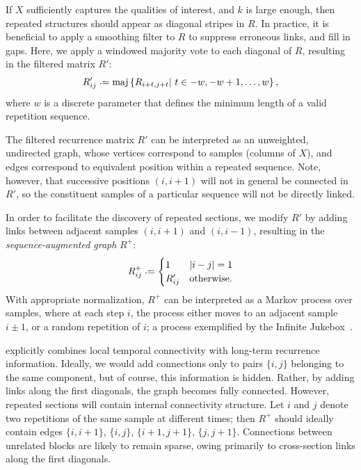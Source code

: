 \documentclass{article}
\begin{document}

If $X$ sufficiently captures the qualities of interest, and $k$ is large
enough, then repeated structures should appear as diagonal stripes in $R$.
In practice, it is beneficial to apply a smoothing filter to $R$ to suppress erroneous
links, and fill in gaps.  Here, we apply a windowed majority vote to each diagonal of
$R$, resulting in the filtered matrix $R'$:
\begin{equation}
R'_{ij} \defeq \maj\left\{ R_{i+t, j+t} \given t \in -w, -w+1, \dots, w\right\},
\label{filtered-rep}
\end{equation}
where $w$ is a discrete parameter that defines the minimum length of a valid
repetition sequence.

The filtered recurrence matrix $R'$ can be interpreted as an unweighted, undirected 
graph, whose vertices correspond to samples (columns of $X$), and edges correspond 
to equivalent position within a repeated sequence. Note, however, that successive 
positions $(i, i+1)$ will not in general be connected in $R'$, so the constituent 
samples of a particular sequence will not be directly linked.

In order to facilitate the discovery of repeated sections, we modify $R'$ by 
adding links between adjacent samples $(i, i+1)$ and $(i, i-1)$, resulting in the
\emph{sequence-augmented graph} $R^+$:
\begin{equation}
R^+_{ij} \defeq \begin{cases}
1 & |i - j| = 1\\
R'_{ij} & \text{otherwise}.
\end{cases}\label{pathmatrix}
\end{equation}
With appropriate normalization, $R^+$ can be interpreted as a Markov process
over samples, where at each step $i$, the process either moves to an adjacent
sample $i\pm1$, or a random repetition of $i$; a process exemplified by the 
Infinite Jukebox~\cite{infinitejukebox}.

 explicitly combines local temporal connectivity with long-term
recurrence information.  Ideally, we would add connections only to pairs $\{i,j\}$
belonging to the same component, but of course, this information is hidden.  Rather,
by adding links along the first diagonals, the graph becomes fully connected.  
However, repeated sections will contain internal connectivity structure.  Let $i$ and
$j$ denote two repetitions of the same sample at different times; then $R^+$ should
ideally contain edges $\{i, i+1\}$, $\{i, j\}$, $\{i+1, j+1\}$, $\{j, j+1\}$.
Connections between unrelated blocks are likely to remain sparse, owing primarily to
cross-section links along the first diagonals.  
\end{document}
